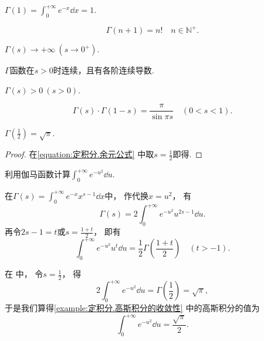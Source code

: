 \begin{proposition}
\(\Gamma(1) = \int_0^{+\infty} e^{-x} \dd{x} = 1\).
\end{proposition}

\begin{proposition}
\begin{equation}\label{equation:定积分.伽马函数与阶乘的联系}
	\Gamma(n+1) = n!
	\quad n\in\mathbb{N}^+.
\end{equation}
\end{proposition}

\begin{proposition}
\(\Gamma(s) \to +\infty\ (s\to0^+)\).
\end{proposition}

\begin{proposition}
\(\Gamma\)函数在\(s > 0\)时连续，且有各阶连续导数.
\end{proposition}

\begin{proposition}
\(\Gamma(s) > 0\ (s>0)\).
\end{proposition}

\begin{property}[余元公式]
\begin{equation}\label{equation:定积分.余元公式}
	\Gamma(s) \cdot \Gamma(1-s)
	= \frac{\pi}{\sin{\pi s}} \quad (0 < s < 1).
\end{equation}
\end{property}

\begin{corollary}
\(\Gamma\left(\frac{1}{2}\right) = \sqrt{\pi}\).
\begin{proof}
在\cref{equation:定积分.余元公式} 中取\(s = \frac12\)即得.
\end{proof}
\end{corollary}

\begin{example}
利用伽马函数计算\(\int_0^{+\infty} e^{-u^2} \dd{u}\).
\begin{solution}
在\(\Gamma(s) = \int_0^{+\infty} e^{-x} x^{s-1} \dd{x}\)中，
作代换\(x = u^2\)，
有\begin{equation}\label{equation:定积分.伽马函数.中间步骤1}
	\Gamma(s) = 2 \int_0^{+\infty} e^{-u^2} u^{2s-1} \dd{u}.
\end{equation}
再令\(2s-1 = t\)或\(s = \frac{1+t}{2}\)，
即有\begin{equation}
	\int_0^{+\infty} e^{-u^2} u^t \dd{u}
	= \frac{1}{2} \Gamma\left(\frac{1+t}{2}\right)
	\quad (t > -1).
\end{equation}

在  中，
令\(s=\frac12\)，
得\[
	2\int_0^{+\infty} e^{-u^2} \dd{u}
	= \Gamma\left(\frac{1}{2}\right)
	= \sqrt{\pi},
\]
于是我们算得\cref{example:定积分.高斯积分的收敛性} 中的高斯积分的值为\begin{equation}
	\int_0^{+\infty} e^{-u^2} \dd{u} = \frac{\sqrt{\pi}}{2}.
\end{equation}
\end{solution}
\end{example}

